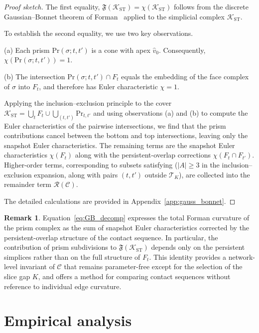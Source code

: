 \documentclass[
    pre,
    twocolumn,
    superscriptaddress,
    showpacs,
    nofootinbib,
    amsmath,
    amssymb,
    floatfix
]{revtex4-2}
\newcommand{\K}{\mathcal{K}}
\theoremstyle{plain} %
\theoremstyle{definition} %
\newtheorem{remark}{\indent Remark}
\begin{document}
\begin{proof}[Proof sketch]
The first equality, $\mathfrak{F}(\K_{\mathrm{ST}}) = \chi(\K_{\mathrm{ST}})$
follows from the discrete Gaussian--Bonnet theorem of Forman~\cite{Forman2003} applied
to the simplicial complex $\K_{\mathrm{ST}}$.

To establish the second equality, we use two key observations.

(a) Each prism $\mathrm{Pr}(\sigma; t, t')$ is a cone with apex $\hat v_0$.
Consequently, $\chi(\mathrm{Pr}(\sigma; t, t')) = 1$.

(b) The intersection $\mathrm{Pr}(\sigma; t, t') \cap F_t$ equals the embedding
of the face complex of $\sigma$ into $F_t$, and therefore has Euler characteristic $\chi = 1$.

Applying the inclusion--exclusion principle to the cover
$\K_{\mathrm{ST}} = \bigcup_t F_t \cup \bigcup_{(t,t')} \mathrm{Pr}_{t,t'}$
and using observations (a) and (b) to compute the Euler characteristics of the pairwise
intersections, we find that the prism contributions cancel between the bottom and top intersections, leaving only the snapshot Euler characteristics.
The remaining terms are the snapshot Euler characteristics $\chi(F_t)$ along with the persistent-overlap corrections $\chi(F_t \cap F_{t'})$.
Higher-order terms, corresponding to subsets satisfying ($|A| \geq 3$ in the inclusion--exclusion expansion,
along with pairs $(t, t')$ outside $\mathcal{T}_K$), are collected into the
remainder term $\mathcal{R}(\mathcal{C})$.  

The detailed calculations are provided in Appendix~\ref{app:gauss_bonnet}.
\end{proof}

\begin{remark}\label{rem:GB_interpretation}
Equation~\eqref{eq:GB_decomp} expresses the total Forman curvature of the prism complex as the sum of snapshot Euler characteristics corrected by the persistent-overlap structure of the contact sequence.
In particular, the contribution of prism subdivisions to $\mathfrak{F}(\K_{\mathrm{ST}})$ depends only on the persistent simplices rather than on the full structure of $F_t$.
This identity provides a network-level invariant of $\mathcal{C}$ that remains parameter-free except for the selection of the slice gap $K$, and offers a method for comparing contact sequences without reference to individual edge curvature.
\end{remark}

\section{Empirical analysis}\label{sec:analysis}
\end{document}

